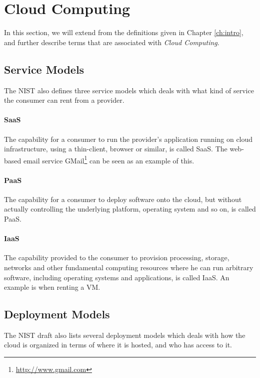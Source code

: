 \documentclass[pdftex,english,10pt,b5paper,twoside]{book}
\begin{document}
\section{Cloud Computing}

In this section, we will extend from the definitions given in Chapter
\ref{ch:intro}, and further describe terms that are associated with
\emph{Cloud Computing}.

\subsection{Service Models}
The \ac{NIST} also defines three service models which deals with what kind of
service the consumer can rent from a provider.

\paragraph{\ac{SaaS}} The capability for a consumer to run the provider's
application running on cloud infrastructure, using a thin-client, browser or
similar, is called \ac{SaaS}. The web-based email service
GMail\footnote{\url{http://www.gmail.com}} can be seen as an example of this.

\paragraph{\ac{PaaS}} The capability for a consumer to deploy software onto
the cloud, but without actually controlling the underlying platform, operating
system and so on, is called \ac{PaaS}.

\paragraph{\ac{IaaS}} The capability provided to the consumer to provision
processing, storage, networks and other fundamental computing resources where
he can run arbitrary software, including operating systems and applications, is
called \ac{IaaS}. An example is when renting a \ac{VM}.

\subsection{Deployment Models}

The \ac{NIST} draft \cite{cloud_nistdef} also lists several deployment models
which deals with how the cloud is organized in terms of where it is hosted, and
who has access to it.
\end{document}

